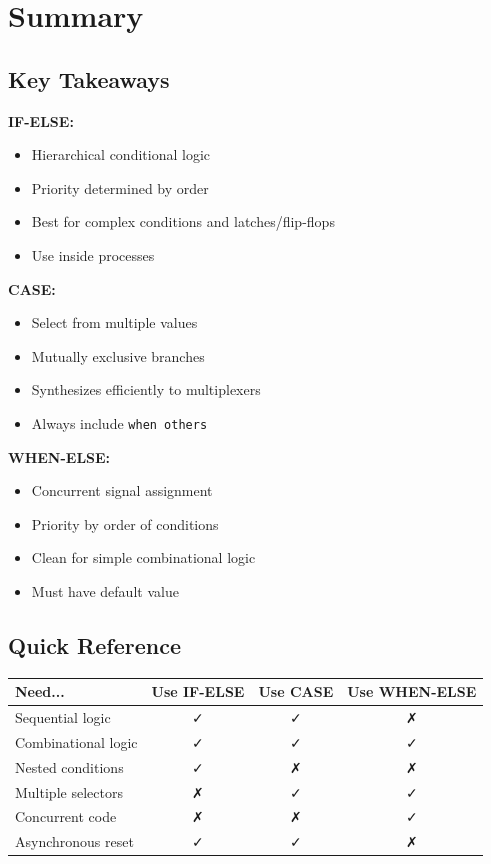 \documentclass[12pt,a4paper]{article}
\begin{document}
\newpage
\section{Summary}

\subsection{Key Takeaways}

\textbf{IF-ELSE:}
\begin{itemize}
    \item Hierarchical conditional logic
    \item Priority determined by order
    \item Best for complex conditions and latches/flip-flops
    \item Use inside processes
\end{itemize}

\textbf{CASE:}
\begin{itemize}
    \item Select from multiple values
    \item Mutually exclusive branches
    \item Synthesizes efficiently to multiplexers
    \item Always include \texttt{when others}
\end{itemize}

\textbf{WHEN-ELSE:}
\begin{itemize}
    \item Concurrent signal assignment
    \item Priority by order of conditions
    \item Clean for simple combinational logic
    \item Must have default value
\end{itemize}

\subsection{Quick Reference}

\begin{table}[h]
\centering
\begin{tabular}{|l|c|c|c|}
\hline
\textbf{Need...} & \textbf{Use IF-ELSE} & \textbf{Use CASE} & \textbf{Use WHEN-ELSE} \\
\hline
Sequential logic & ✓ & ✓ & ✗ \\
\hline
Combinational logic & ✓ & ✓ & ✓ \\
\hline
Nested conditions & ✓ & ✗ & ✗ \\
\hline
Multiple selectors & ✗ & ✓ & ✓ \\
\hline
Concurrent code & ✗ & ✗ & ✓ \\
\hline
Asynchronous reset & ✓ & ✓ & ✗ \\
\hline
\end{tabular}
\end{table}
\end{document}
